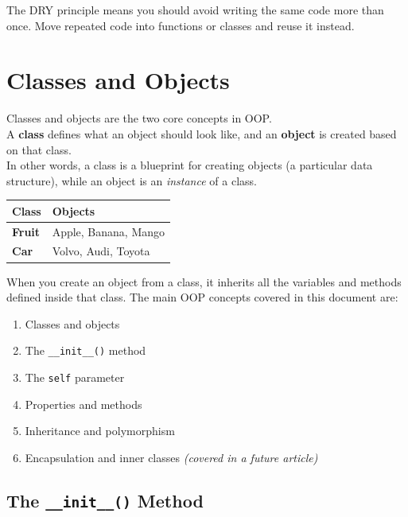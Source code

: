 \documentclass[11pt, a4paper]{article}
\begin{document}
\begin{mytip}
The DRY principle means you should avoid writing the same code more than once. Move repeated code into functions or classes and reuse it instead.
\end{mytip}

\section{Classes and Objects}

Classes and objects are the two core concepts in OOP.\\
A \textbf{class} defines what an object should look like, and an \textbf{object} is created based on that class.\\
In other words, a class is a blueprint for creating objects (a particular data structure), while an object is an \emph{instance} of a class.

\medskip
\begin{center}
\begin{tabular}{>{\bfseries}l l}
  \toprule
  Class & Objects \\
  \midrule
  Fruit & Apple, Banana, Mango \\
  Car   & Volvo, Audi, Toyota  \\
  \bottomrule
\end{tabular}
\end{center}
\medskip

When you create an object from a class, it inherits all the variables and methods defined inside that class. The main OOP concepts covered in this document are:

\begin{enumerate}[leftmargin=1.5em, itemsep=2pt]
  \item Classes and objects
  \item The \texttt{\_\_init\_\_()} method
  \item The \texttt{self} parameter
  \item Properties and methods
  \item Inheritance and polymorphism
  \item Encapsulation and inner classes \textit{(covered in a future article)}
\end{enumerate}

\subsection{The \texttt{\_\_init\_\_()} Method}
\end{document}
